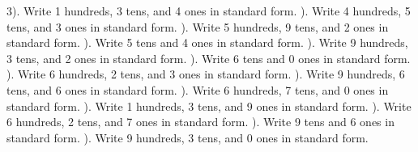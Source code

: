 \documentclass{article}%
\begin{document}
3). Write 1 hundreds, 3 tens, and 4 ones in standard form.%
\newline%
\newline%
). Write 4 hundreds, 5 tens, and 3 ones in standard form.%
\newline%
\newline%
). Write 5 hundreds, 9 tens, and 2 ones in standard form.%
\newline%
\newline%
). Write 5 tens and 4 ones in standard form.%
\newline%
\newline%
). Write 9 hundreds, 3 tens, and 2 ones in standard form.%
\newline%
\newline%
). Write 6 tens and 0 ones in standard form.%
\newline%
\newline%
). Write 6 hundreds, 2 tens, and 3 ones in standard form.%
\newline%
\newline%
). Write 9 hundreds, 6 tens, and 6 ones in standard form.%
\newline%
\newline%
). Write 6 hundreds, 7 tens, and 0 ones in standard form.%
\newline%
\newline%
). Write 1 hundreds, 3 tens, and 9 ones in standard form.%
\newline%
\newline%
). Write 6 hundreds, 2 tens, and 7 ones in standard form.%
\newline%
\newline%
). Write 9 tens and 6 ones in standard form.%
\newline%
\newline%
). Write 9 hundreds, 3 tens, and 0 ones in standard form.%
\newline%
\newline%
\end{document}
